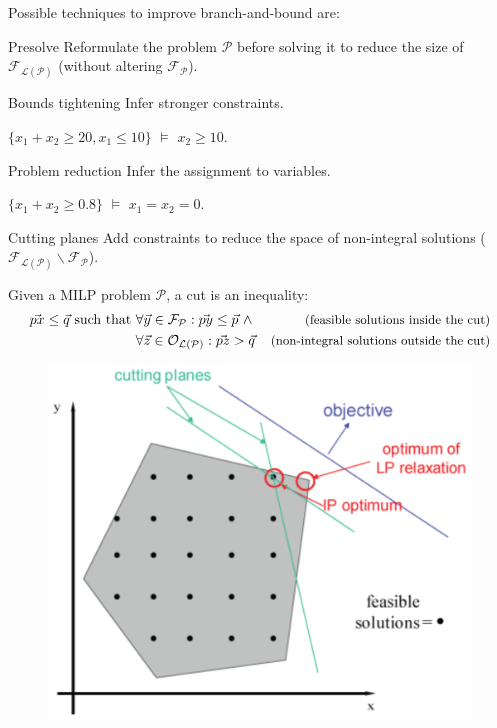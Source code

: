 Possible techniques to improve branch-and-bound are:
\begin{descriptionlist}
    \item[Presolve] 
        Reformulate the problem $\mathcal{P}$ before solving it to reduce 
        the size of $\mathcal{F}_{\mathcal{L}(\mathcal{P})}$ (without altering $\mathcal{F}_{\mathcal{P}}$).
        \begin{descriptionlist}
            \item[Bounds tightening] 
                Infer stronger constraints.
                \begin{example}
                    $\{ x_1 + x_2 \geq 20, x_1 \leq 10 \} \,\,\models\,\, x_2 \geq 10$.
                \end{example}

            \item[Problem reduction] 
                Infer the assignment to variables.
                \begin{example}
                    $\{ x_1 + x_2 \geq 0.8 \} \,\,\models\,\, x_1 = x_2 = 0$.
                \end{example}
        \end{descriptionlist}

    \item[Cutting planes] 
        Add constraints to reduce the space of non-integral solutions ($\mathcal{F}_{\mathcal{L}(\mathcal{P})} \smallsetminus \mathcal{F}_{\mathcal{P}}$).

        Given a MILP problem $\mathcal{P}$, a cut is an inequality:
        \[ 
            \begin{aligned}
                \vec{px} \leq \vec{q} \text{ such that }
                    &\forall \vec{y} \in \mathcal{F}_\mathcal{P}: \vec{py} \leq \vec{p} \,\,\land\,\, &\text{\small(feasible solutions inside the cut)}\\
                    &\forall \vec{z} \in \mathcal{O}_{\mathcal{L}(\mathcal{P})}: \vec{pz} > \vec{q} &\text{\small(non-integral solutions outside the cut)}
            \end{aligned}
        \]

        \begin{figure}[H]
            \centering
            \includegraphics[width=0.39\linewidth]{./img/cutting_planes.png}
        \end{figure}


\end{descriptionlist}
